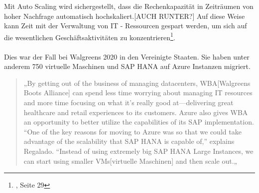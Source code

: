 Mit Auto Scaling wird sichergestellt, dass die Rechenkapazität in Zeiträumen von hoher Nachfrage automatisch hochskaliert.[AUCH RUNTER?]
Auf diese Weise kann Zeit mit der Verwaltung von IT - Ressourcen gespart werden, um sich auf die wesentlichen Geschäftsaktivitäten zu konzentrieren\footnote{{\cite{AWS1}}, Seite 29}.
\\\\
Dies war der Fall bei Walgreens 2020 in den Vereinigte Staaten.
Sie haben unter anderem 750 virtuelle Maschinen und SAP HANA auf Azure Instanzen migriert.

\begin{quote}
      „By getting out of the business of managing datacenters, WBA[Walgreens Boots Alliance] can spend less time worrying about managing IT resources and more time focusing on what it’s really good at—delivering great healthcare and retail experiences to its customers. Azure also gives WBA an opportunity to better utilize the capabilities of its SAP implementation. “One of the key reasons for moving to Azure was so that we could take advantage of the scalability that SAP HANA is capable of,” explains Regalado. “Instead of using extremely big SAP HANA Large Instances, we can start using smaller VMs[virtuelle Maschinen] and then scale out.„

      {\cite{AZU01}}
\end{quote}

